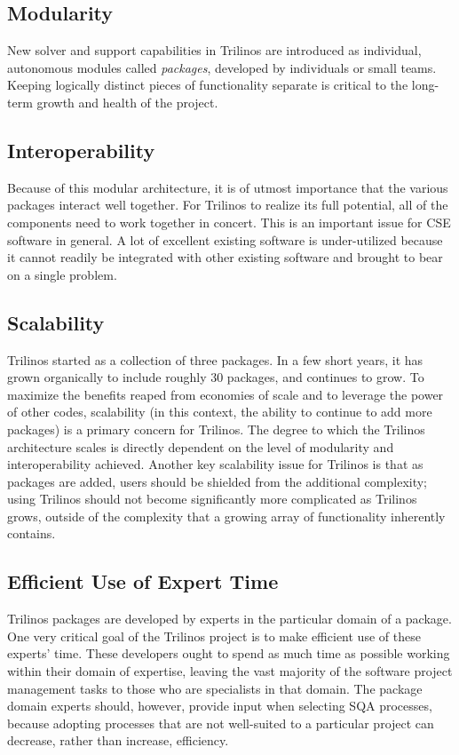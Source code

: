 \documentclass{doublecol}
\begin{document}
\subsection{Modularity}
New solver and support capabilities in Trilinos are introduced as
individual, autonomous modules called \emph{packages}, developed by
individuals or small teams. Keeping logically distinct pieces of
functionality separate is critical to the long-term growth and
health of the project.

\subsection{Interoperability}
Because of this modular architecture, it is of utmost importance
that the various packages interact well together.  For Trilinos to
realize its full potential, all of the components need to work
together in concert.  This is an important issue for CSE software in
general.  A lot of excellent existing software is under-utilized
because it cannot readily be integrated with other existing software
and brought to bear on a single problem.

\subsection{Scalability}
Trilinos started as a collection of three packages.  In a few short
years, it has grown organically to include roughly 30 packages, and
continues to grow. To maximize the benefits reaped from economies of
scale and to leverage the power of other codes, scalability (in this
context, the ability to continue to add more packages) is a primary
concern for Trilinos. The degree to which the Trilinos architecture
scales is directly dependent on the level of modularity and
interoperability achieved. Another key scalability issue for
Trilinos is that as packages are added, users should be shielded
from the additional complexity; using Trilinos should not become
significantly more complicated as Trilinos grows, outside of the
complexity that a growing array of functionality inherently
contains.

\subsection{Efficient Use of Expert Time}
Trilinos packages are developed by experts in the particular domain
of a package.  One very critical goal of the Trilinos project is to
make efficient use of these experts' time.  These developers ought
to spend as much time as possible working within their domain of
expertise, leaving the vast majority of the software project
management tasks to those who are specialists in that domain.  The
package domain experts should, however, provide input when selecting
SQA processes, because adopting processes that are not well-suited
to a particular project can decrease, rather than increase,
efficiency.
\end{document}
